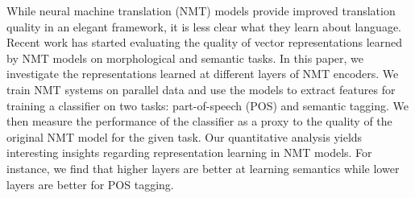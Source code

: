 While neural machine translation (NMT) models provide improved translation quality in an elegant framework, it is less clear what they learn about language. Recent work has started evaluating the quality of vector representations learned by NMT models on morphological and semantic tasks. In this paper, we investigate the representations learned at different layers of NMT encoders. We train NMT systems on parallel data and use the models to extract features for training a classifier on two tasks: part-of-speech (POS) and semantic tagging. We then measure the performance of the classifier as a proxy to the quality of the original NMT model for the given task. Our quantitative analysis yields interesting insights regarding representation learning in NMT models. For instance, we find that higher layers are better at learning semantics while lower layers are better for POS tagging.
